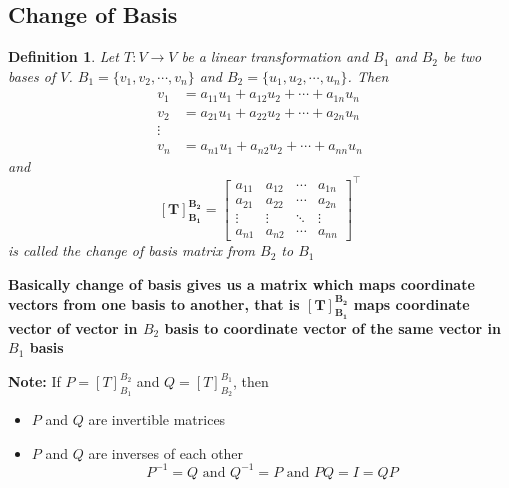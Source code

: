 \documentclass[a4paper, titlepage]{article}
\newtheorem{definition}{Definition}[section]
\begin{document}
    \subsection{Change of Basis}
        \begin{definition}
            Let $T: V \to V$ be a linear transformation and $B_1$ 
            and $B_2$ be two bases of $V$. $B_1 = \{ v_1, v_2, 
            \cdots, v_n \}$ and $B_2 = \{ u_1, u_2, \cdots, u_n \}$.
            Then 
            \begin{align*}
                v_1 &= a_{11}u_1 + a_{12}u_2 + \cdots + a_{1n}u_n \\
                v_2 &= a_{21}u_1 + a_{22}u_2 + \cdots + a_{2n}u_n \\
                \vdots \\
                v_n &= a_{n1}u_1 + a_{n2}u_2 + \cdots + a_{nn}u_n
            \end{align*}
            and
            $$
                \bm{[T]_{B_1}^{B_2}} = 
                        \begin{bmatrix}
                            a_{11} & a_{12} & \cdots & a_{1n} \\
                            a_{21} & a_{22} & \cdots & a_{2n} \\
                            \vdots & \vdots & \ddots & \vdots \\
                            a_{n1} & a_{n2} & \cdots & a_{nn}
                        \end{bmatrix} ^ \intercal
            $$ is called the change of basis matrix from $B_2$
            to $B_1$
        \end{definition}

        \noindent \textbf{Basically change of basis gives us a 
        matrix which maps coordinate vectors from one basis to 
        another, that is $\bm{[T]_{B_1}^{B_2}}$ maps coordinate
        vector of vector in $B_2$ basis to coordinate vector of the
        same vector in $B_1$ basis}

        \vspace*{1em}
        \noindent\textbf{Note: }If $P = [T]_{B_1}^{B_2}$ and $Q =
        [T]_{B_2}^{B_1}$, then
        \begin{itemize}
            \item $P$ and $Q$ are invertible matrices
            \item $P$ and $Q$ are inverses of each other
            $$P^{-1} = Q \text{ and } Q^{-1} = P \text{ and }
            PQ = I = QP $$
        \end{itemize}
    
\end{document}
